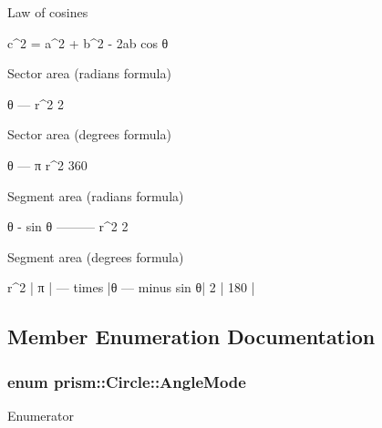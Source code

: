 Law of cosines 
\begin{DoxyCode}
c^2 = a^2 + b^2 - 2ab cos θ
\end{DoxyCode}


Sector area (radians formula) 
\begin{DoxyCode}
 θ
--- r^2
 2
\end{DoxyCode}


Sector area (degrees formula) 
\begin{DoxyCode}
 θ
--- π r^2
360
\end{DoxyCode}


Segment area (radians formula) 
\begin{DoxyCode}
θ - sin θ
--------- r^2
    2
\end{DoxyCode}


Segment area (degrees formula) 
\begin{DoxyCode}
r^2       |   π              |
--- times |θ ---  minus sin θ|
 2        |  180             |
\end{DoxyCode}
 

\subsection{Member Enumeration Documentation}
\subsubsection[{\texorpdfstring{Angle\+Mode}{AngleMode}}]{\setlength{\rightskip}{0pt plus 5cm}enum {\bf prism\+::\+Circle\+::\+Angle\+Mode}}\hypertarget{classprism_1_1_circle_a74c7c532b4eb120b9227b7fabeffe6ac}{}\label{classprism_1_1_circle_a74c7c532b4eb120b9227b7fabeffe6ac}
\begin{Desc}
\item[Enumerator]\par
\begin{description}
\item[{\em 
D\+E\+G\+R\+E\+ES\hypertarget{classprism_1_1_circle_a74c7c532b4eb120b9227b7fabeffe6aca38d734252b9b86d558359698434cf5d4}{}\label{classprism_1_1_circle_a74c7c532b4eb120b9227b7fabeffe6aca38d734252b9b86d558359698434cf5d4}
}]\item[{\em 
R\+A\+D\+I\+A\+NS\hypertarget{classprism_1_1_circle_a74c7c532b4eb120b9227b7fabeffe6aca4e738ac91c0d446d1cd6c0ee11a7baaf}{}\label{classprism_1_1_circle_a74c7c532b4eb120b9227b7fabeffe6aca4e738ac91c0d446d1cd6c0ee11a7baaf}
}]\end{description}
\end{Desc}


